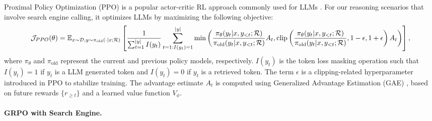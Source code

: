 Proximal Policy Optimization (PPO) \citep{schulman2017proximal} is a popular actor-critic RL approach commonly used for LLMs \citep{ouyang2022training}.
For our reasoning scenarios that involve search engine calling, it optimizes LLMs by maximizing the following objective:
{\scriptsize
\begin{gather}\label{eq:ppo}
\mathcal{J}_{PPO}(\theta) = \mathbb{E}_{x \sim \mathcal{D}, y \sim \pi_{\text{old}}( \cdot| x; \mathcal{R})}
\left[ \frac{1}{\sum_{t=1}^{|y|} I(y_t)} \sum_{t=1: I(y_t)=1}^{|y|}
\min \left( \frac{\pi_{\theta}(y_t | x, y_{<t}; \mathcal{R})}{\pi_{\text{old}}(y_t | x, y_{<t}; \mathcal{R})} A_t, 
\text{clip} \left( \frac{\pi_{\theta}(y_t | x, y_{<t}; \mathcal{R})}{\pi_{\text{old}}(y_t | x, y_{<t}; \mathcal{R})}, 1 - \epsilon, 1 + \epsilon \right) A_t 
\right) \right],
\end{gather}}
where \( \pi_{\theta} \) and \( \pi_{\text{old}} \) represent the current and previous policy models, respectively. 
$I(y_t)$ is the token loss masking operation such that $I(y_t)=1$ if $y_t$ is a LLM generated token and $I(y_t)=0$ if $y_t$ is a retrieved token.
The term \( \epsilon \) is a clipping-related hyperparameter introduced in PPO to stabilize training. 
The advantage estimate \( A_t \) is computed using Generalized Advantage Estimation (GAE) \citep{schulman2015high}, based on future rewards \( \{ r_{\geq t} \} \) and a learned value function \( V_{\phi} \).


\paragraph{GRPO with Search Engine.}

